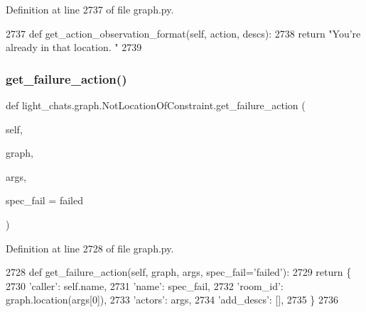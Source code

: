 Definition at line 2737 of file graph.\+py.


\begin{DoxyCode}
2737     \textcolor{keyword}{def }get\_action\_observation\_format(self, action, descs):
2738         \textcolor{keywordflow}{return} \textcolor{stringliteral}{"You're already in that location. "}
2739 
\end{DoxyCode}
\mbox{\label{classlight__chats_1_1graph_1_1NotLocationOfConstraint_a77abc55b110bb7287c88b7623fe06d13}} 
\subsubsection{\texorpdfstring{get\+\_\+failure\+\_\+action()}{get\_failure\_action()}}
{\footnotesize\ttfamily def light\+\_\+chats.\+graph.\+Not\+Location\+Of\+Constraint.\+get\+\_\+failure\+\_\+action (\begin{DoxyParamCaption}\item[{}]{self,  }\item[{}]{graph,  }\item[{}]{args,  }\item[{}]{spec\+\_\+fail = {\ttfamily \textquotesingle{}failed\textquotesingle{}} }\end{DoxyParamCaption})}



Definition at line 2728 of file graph.\+py.


\begin{DoxyCode}
2728     \textcolor{keyword}{def }get\_failure\_action(self, graph, args, spec\_fail='failed'):
2729         \textcolor{keywordflow}{return} \{
2730             \textcolor{stringliteral}{'caller'}: self.name,
2731             \textcolor{stringliteral}{'name'}: spec\_fail,
2732             \textcolor{stringliteral}{'room\_id'}: graph.location(args[0]),
2733             \textcolor{stringliteral}{'actors'}: args,
2734             \textcolor{stringliteral}{'add\_descs'}: [],
2735         \}
2736 
\end{DoxyCode}



